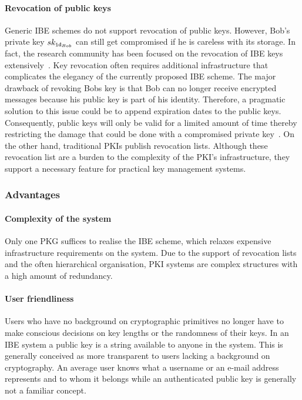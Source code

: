 \paragraph{Revocation of public keys}
Generic IBE schemes do not support revocation of public keys. However, Bob's private key $sk_{\mathtt{id}_{Bob}}$ can still get compromised if he is careless with its storage. In fact, the research community has been focused on the revocation of IBE keys extensively~\cite{art:BoldyrevaGK12,art:BonehDTW01,art:HanaokaHSI05,art:LibertQ03}. Key revocation often requires additional infrastructure that complicates the elegancy of the currently proposed IBE scheme. The major drawback of revoking Bobs key is that Bob can no longer receive encrypted messages because his public key is part of his identity. Therefore, a pragmatic solution to this issue could be to append expiration dates to the public keys. Consequently, public keys will only be valid for a limited amount of time thereby restricting the damage that could be done with a compromised private key~\cite{art:BonehF01}. On the other hand, traditional PKIs publish revocation lists. Although these revocation list are a burden to the complexity of the PKI's infrastructure, they support a necessary feature for practical key management systems. 

\subsubsection{Advantages}
\paragraph{Complexity of the system}
Only one PKG suffices to realise the IBE scheme, which relaxes expensive infrastructure requirements on the system. Due to the support of revocation lists and the often hierarchical organisation, PKI systems are complex structures with a high amount of redundancy.

\paragraph{User friendliness}
Users who have no background on cryptographic primitives no longer have to make conscious decisions on key lengths or the randomness of their keys. In an IBE system a public key is a string available to anyone in the system. This is generally conceived as more transparent to users lacking a background on cryptography. An average user knows what a username or an e-mail address represents and to whom it belongs while an authenticated public key is generally not a familiar concept.

